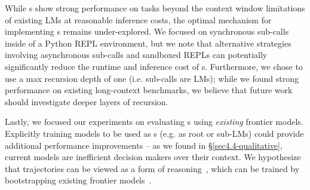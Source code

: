 While \RLM{}s show strong performance on tasks beyond the context window limitations of existing LMs at reasonable inference costs, the optimal mechanism for implementing \RLM{}s remains under-explored. We focused on synchronous sub-calls inside of a Python REPL environment, but we note that alternative strategies involving asynchronous sub-calls and sandboxed REPLs can potentially significantly reduce the runtime and inference cost of \RLM{}s. Furthermore, we chose to use a max recursion depth of one (i.e. sub-calls are LMs); while we found strong performance on existing long-context benchmarks, we believe that future work should investigate deeper layers of recursion. 

Lastly, we focused our experiments on evaluating \RLM{}s using \textit{existing} frontier models. Explicitly training models to be used as \RLM{}s (e.g. as root or sub-LMs) could provide additional performance improvements -- as we found in \S\ref{sec4.4-qualitative}, current models are inefficient decision makers over their context. We hypothesize that \RLM{} trajectories can be viewed as a form of reasoning~\citep{openai2024openaio1card,deepseekai2025deepseekr1incentivizingreasoningcapability}, which can be trained by bootstrapping existing frontier models~\citep{zelikman2022starbootstrappingreasoningreasoning, zelikman2024quietstarlanguagemodelsteach}. %
